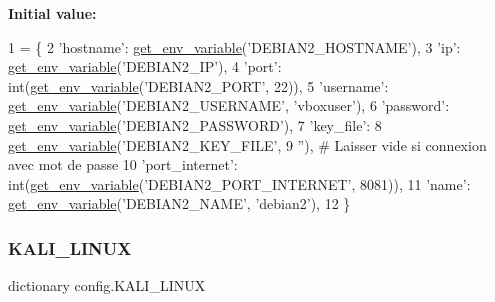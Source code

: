 {\bfseries Initial value\+:}
\begin{DoxyCode}
1 =  \{
2     \textcolor{stringliteral}{'hostname'}: \hyperlink{namespaceconfig_a7cf1bd9315cd5f3237441a2d9414082d}{get\_env\_variable}(\textcolor{stringliteral}{'DEBIAN2\_HOSTNAME'}),
3     \textcolor{stringliteral}{'ip'}: \hyperlink{namespaceconfig_a7cf1bd9315cd5f3237441a2d9414082d}{get\_env\_variable}(\textcolor{stringliteral}{'DEBIAN2\_IP'}),
4     \textcolor{stringliteral}{'port'}: int(\hyperlink{namespaceconfig_a7cf1bd9315cd5f3237441a2d9414082d}{get\_env\_variable}(\textcolor{stringliteral}{'DEBIAN2\_PORT'}, 22)),
5     \textcolor{stringliteral}{'username'}: \hyperlink{namespaceconfig_a7cf1bd9315cd5f3237441a2d9414082d}{get\_env\_variable}(\textcolor{stringliteral}{'DEBIAN2\_USERNAME'}, \textcolor{stringliteral}{'vboxuser'}),
6     \textcolor{stringliteral}{'password'}: \hyperlink{namespaceconfig_a7cf1bd9315cd5f3237441a2d9414082d}{get\_env\_variable}(\textcolor{stringliteral}{'DEBIAN2\_PASSWORD'}),
7     \textcolor{stringliteral}{'key\_file'}:
8     \hyperlink{namespaceconfig_a7cf1bd9315cd5f3237441a2d9414082d}{get\_env\_variable}(\textcolor{stringliteral}{'DEBIAN2\_KEY\_FILE'},
9                      \textcolor{stringliteral}{''}),  \textcolor{comment}{# Laisser vide si connexion avec mot de passe}
10     \textcolor{stringliteral}{'port\_internet'}: int(\hyperlink{namespaceconfig_a7cf1bd9315cd5f3237441a2d9414082d}{get\_env\_variable}(\textcolor{stringliteral}{'DEBIAN2\_PORT\_INTERNET'}, 8081)),
11     \textcolor{stringliteral}{'name'}: \hyperlink{namespaceconfig_a7cf1bd9315cd5f3237441a2d9414082d}{get\_env\_variable}(\textcolor{stringliteral}{'DEBIAN2\_NAME'}, \textcolor{stringliteral}{'debian2'}),
12 \}
\end{DoxyCode}
\mbox{\label{namespaceconfig_a1583c06065c1cef60bf9da180f5482f6}} 
\subsubsection{\texorpdfstring{K\+A\+L\+I\+\_\+\+L\+I\+N\+UX}{KALI\_LINUX}}
{\footnotesize\ttfamily dictionary config.\+K\+A\+L\+I\+\_\+\+L\+I\+N\+UX}

